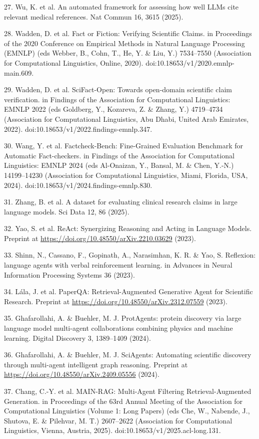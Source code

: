 \documentclass[
]{article}
\begin{document}
27. Wu, K. et al. An automated framework for assessing how well LLMs cite relevant medical references. Nat Commun 16, 3615 (2025).

28. Wadden, D. et al. Fact or Fiction: Verifying Scientific Claims. in Proceedings of the 2020 Conference on Empirical Methods in Natural Language Processing (EMNLP) (eds Webber, B., Cohn, T., He, Y. \& Liu, Y.) 7534--7550 (Association for Computational Linguistics, Online, 2020). doi:10.18653/v1/2020.emnlp-main.609.

29. Wadden, D. et al. SciFact-Open: Towards open-domain scientific claim verification. in Findings of the Association for Computational Linguistics: EMNLP 2022 (eds Goldberg, Y., Kozareva, Z. \& Zhang, Y.) 4719--4734 (Association for Computational Linguistics, Abu Dhabi, United Arab Emirates, 2022). doi:10.18653/v1/2022.findings-emnlp.347.

30. Wang, Y. et al. Factcheck-Bench: Fine-Grained Evaluation Benchmark for Automatic Fact-checkers. in Findings of the Association for Computational Linguistics: EMNLP 2024 (eds Al-Onaizan, Y., Bansal, M. \& Chen, Y.-N.) 14199--14230 (Association for Computational Linguistics, Miami, Florida, USA, 2024). doi:10.18653/v1/2024.findings-emnlp.830.

31. Zhang, B. et al. A dataset for evaluating clinical research claims in large language models. Sci Data 12, 86 (2025).

32. Yao, S. et al. ReAct: Synergizing Reasoning and Acting in Language Models. Preprint at \url{https://doi.org/10.48550/arXiv.2210.03629} (2023).

33. Shinn, N., Cassano, F., Gopinath, A., Narasimhan, K. R. \& Yao, S. Reflexion: language agents with verbal reinforcement learning. in Advances in Neural Information Processing Systems 36 (2023).

34. Lála, J. et al. PaperQA: Retrieval-Augmented Generative Agent for Scientific Research. Preprint at \url{https://doi.org/10.48550/arXiv.2312.07559} (2023).

35. Ghafarollahi, A. \& Buehler, M. J. ProtAgents: protein discovery via large language model multi-agent collaborations combining physics and machine learning. Digital Discovery 3, 1389--1409 (2024).

36. Ghafarollahi, A. \& Buehler, M. J. SciAgents: Automating scientific discovery through multi-agent intelligent graph reasoning. Preprint at \url{https://doi.org/10.48550/arXiv.2409.05556} (2024).

37. Chang, C.-Y. et al. MAIN-RAG: Multi-Agent Filtering Retrieval-Augmented Generation. in Proceedings of the 63rd Annual Meeting of the Association for Computational Linguistics (Volume 1: Long Papers) (eds Che, W., Nabende, J., Shutova, E. \& Pilehvar, M. T.) 2607--2622 (Association for Computational Linguistics, Vienna, Austria, 2025). doi:10.18653/v1/2025.acl-long.131.
\end{document}
